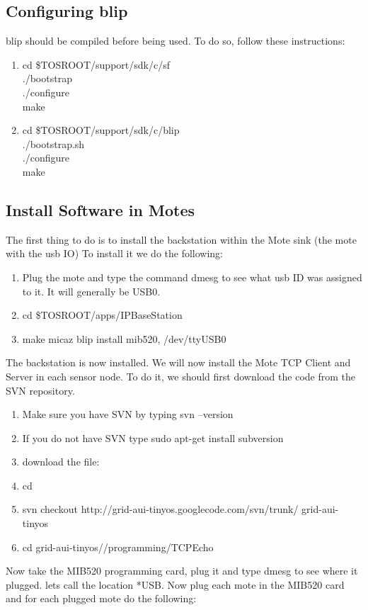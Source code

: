 \documentclass[oneside,12pt,a4paper,final]{book}
\begin{document}
\subsection{Configuring \gls{blip}}
\gls{blip} should be compiled before being used. To do so, follow these instructions:
\begin{enumerate}
\item cd \$TOSROOT/support/sdk/c/sf \\
./bootstrap \\
./configure \\
make 
\item cd \$TOSROOT/support/sdk/c/blip \\
./bootstrap.sh \\
./configure \\
make 
\end{enumerate}

\subsection{Install Software in Motes}
The first thing to do is to install the backstation within the Mote sink (the mote with the \gls{usb} IO) To install it we do the following:
\begin{enumerate}
\item Plug the mote and type the command dmesg to see what \gls{usb} ID was assigned to it. It will generally be USB0.
\item cd \$TOSROOT/apps/IPBaseStation
\item make micaz blip install  mib520, /dev/ttyUSB0
\end{enumerate}
The backstation is now installed. We will now install the Mote TCP Client and Server in each sensor node. To do it, we should first download the code from the SVN repository.
\begin{enumerate}
\item Make sure you have SVN by typing svn --version
\item If you do not have SVN type sudo apt-get install subversion
\item download the file:
\item cd
\item svn checkout http://grid-aui-tinyos.googlecode.com/svn/trunk/ grid-aui-tinyos
\item cd grid-aui-tinyos//programming/TCPEcho
\end{enumerate}
Now take the MIB520 programming card, plug it and type dmesg to see where it plugged. lets call the location *USB. Now plug each mote in the MIB520 card and for each plugged mote do the following:
\end{document}
